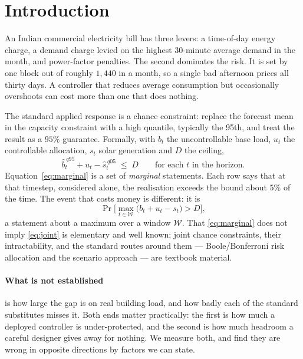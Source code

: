 \section{Introduction}

An Indian commercial electricity bill has three levers: a time-of-day energy
charge, a demand charge levied on the highest 30-minute average demand in the
month, and power-factor penalties. The second dominates the risk. It is set by
one block out of roughly $1{,}440$ in a month, so a single bad afternoon prices
all thirty days. A controller that reduces average consumption but occasionally
overshoots can cost more than one that does nothing.

The standard applied response is a chance constraint: replace the forecast mean
in the capacity constraint with a high quantile, typically the 95th, and treat
the result as a $95\%$ guarantee. Formally, with $b_t$ the uncontrollable base
load, $u_t$ the controllable allocation, $s_t$ solar generation and $D$ the
ceiling,
%
\begin{equation}
  \hat b^{\,q95}_t + u_t - \hat s^{\,q05}_t \;\le\; D
  \qquad \text{for each } t \text{ in the horizon.}
  \label{eq:marginal}
\end{equation}
%
Equation~\eqref{eq:marginal} is a set of \emph{marginal} statements. Each row
says that at that timestep, considered alone, the realisation exceeds the bound
about $5\%$ of the time. The event that costs money is different: it is
%
\begin{equation}
  \Pr\Big[\max_{t \in \mathcal{W}} \big(b_t + u_t - s_t\big) > D\Big],
  \label{eq:joint}
\end{equation}
%
a statement about a maximum over a window $\mathcal{W}$. That
\eqref{eq:marginal} does not imply \eqref{eq:joint} is elementary and well
known; joint chance constraints, their intractability, and the standard routes
around them --- Boole/Bonferroni risk allocation and the scenario approach
\citep{calafiore2006scenario,nemirovski2006convex} --- are textbook material.

\paragraph{What is not established} is how large the gap is on real building
load, and how badly each of the standard substitutes misses it. Both ends matter
practically: the first is how much a deployed controller is under-protected, and
the second is how much headroom a careful designer gives away for nothing. We
measure both, and find they are wrong in opposite directions by factors we can
state.

